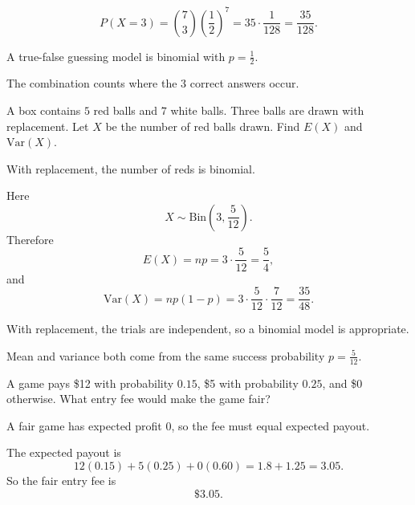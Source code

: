 \begin{solution}
\[
P(X=3)=\binom73\left(\frac12\right)^7=35\cdot \frac1{128}=\frac{35}{128}.
\]
\end{solution}

\begin{takeaways}
\item A true-false guessing model is binomial with $p=\frac12$.
\item The combination counts where the $3$ correct answers occur.
\end{takeaways}

\begin{problem}
A box contains $5$ red balls and $7$ white balls. Three balls are drawn with replacement. Let $X$ be the number of red balls drawn. Find $E(X)$ and $\mathrm{Var}(X)$.
\end{problem}

\begin{hint}
With replacement, the number of reds is binomial.
\end{hint}

\begin{solution}
Here
\[
X\sim \mathrm{Bin}\left(3,\frac5{12}\right).
\]
Therefore
\[
E(X)=np=3\cdot \frac5{12}=\frac54,
\]
and
\[
\mathrm{Var}(X)=np(1-p)=3\cdot \frac5{12}\cdot \frac7{12}=\frac{35}{48}.
\]
\end{solution}

\begin{takeaways}
\item With replacement, the trials are independent, so a binomial model is appropriate.
\item Mean and variance both come from the same success probability $p=\frac5{12}$.
\end{takeaways}

\begin{problem}
A game pays \$12 with probability $0.15$, \$5 with probability $0.25$, and \$0 otherwise. What entry fee would make the game fair?
\end{problem}

\begin{hint}
A fair game has expected profit $0$, so the fee must equal expected payout.
\end{hint}

\begin{solution}
The expected payout is
\[
12(0.15)+5(0.25)+0(0.60)=1.8+1.25=3.05.
\]
So the fair entry fee is
\[
\boxed{\$3.05}.
\]
\end{solution}

